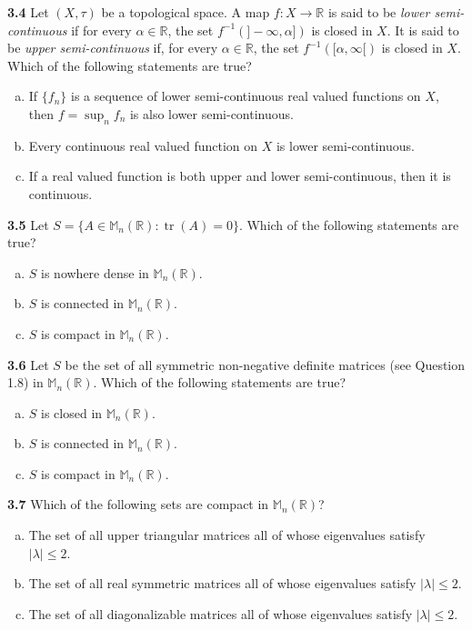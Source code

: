 \documentclass[11pt,a4paper]{article}
\newcommand{\R}{\mathbb{R}}
\newcommand{\M}{\mathbb{M}}
\newcommand{\tr}{\operatorname{tr}}
\newcommand{\qitem}[1]{\par\medskip\noindent\textbf{#1}\hspace{0.5em}}
\begin{document}
\qitem{3.4} Let $(X, \tau)$ be a topological space. A map $f : X \to \R$ is said to be \emph{lower semi-continuous} if for every $\alpha \in \R$, the set $f^{-1}(]-\infty, \alpha])$ is closed in $X$. It is said to be \emph{upper semi-continuous} if, for every $\alpha \in \R$, the set $f^{-1}([\alpha, \infty[)$ is closed in $X$. Which of the following statements are true?
\begin{enumerate}[a.]
  \item If $\{f_n\}$ is a sequence of lower semi-continuous real valued functions on $X$, then $f = \sup_n f_n$ is also lower semi-continuous.
  \item Every continuous real valued function on $X$ is lower semi-continuous.
  \item If a real valued function is both upper and lower semi-continuous, then it is continuous.
\end{enumerate}

\qitem{3.5} Let $S = \{A \in \M_n(\R) : \tr(A) = 0\}$. Which of the following statements are true?
\begin{enumerate}[a.]
  \item $S$ is nowhere dense in $\M_n(\R)$.
  \item $S$ is connected in $\M_n(\R)$.
  \item $S$ is compact in $\M_n(\R)$.
\end{enumerate}

\qitem{3.6} Let $S$ be the set of all symmetric non-negative definite matrices (see Question 1.8) in $\M_n(\R)$. Which of the following statements are true?
\begin{enumerate}[a.]
  \item $S$ is closed in $\M_n(\R)$.
  \item $S$ is connected in $\M_n(\R)$.
  \item $S$ is compact in $\M_n(\R)$.
\end{enumerate}

\qitem{3.7} Which of the following sets are compact in $\M_n(\R)$?
\begin{enumerate}[a.]
  \item The set of all upper triangular matrices all of whose eigenvalues satisfy $|\lambda| \le 2$.
  \item The set of all real symmetric matrices all of whose eigenvalues satisfy $|\lambda| \le 2$.
  \item The set of all diagonalizable matrices all of whose eigenvalues satisfy $|\lambda| \le 2$.
\end{enumerate}
\end{document}
